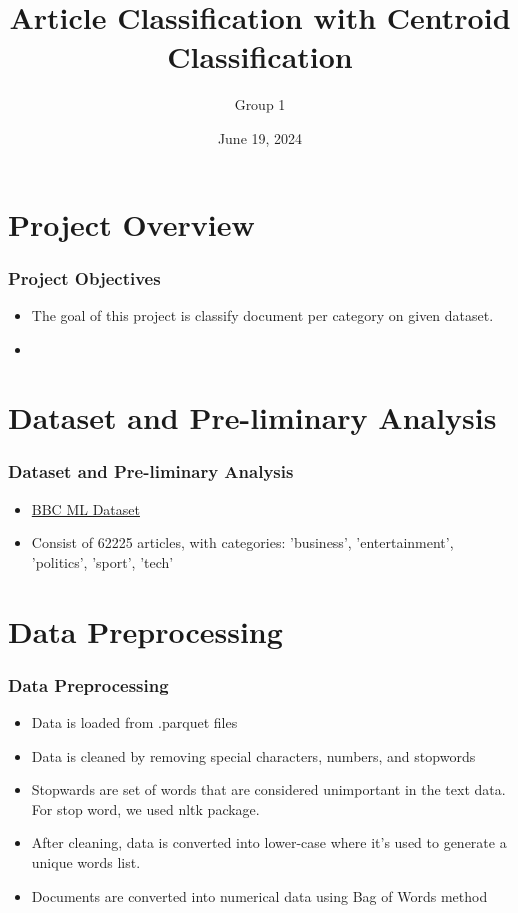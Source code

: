 \documentclass[
    10pt %
    16:9, %
]{beamer}
\title{Article Classification with Centroid Classification}
\subtitle{}
\author{Group 1}
\date[June 19, 2024]
 {June 19, 2024}
\begin{document}
\frame{\titlepage} %
\section[Outline]{}
\frame{\tableofcontents}

\section{Project Overview}
 
\frame %
{
  \frametitle{Project Objectives}
  \begin{itemize}
    \item The goal of this project is classify document per category on given dataset.
    \item 
  \end{itemize}
}
\section{Dataset and Pre-liminary Analysis}
\frame
{
  \frametitle{Dataset and Pre-liminary Analysis}
  \begin{itemize}
    \item \href{http://mlg.ucd.ie/datasets/bbc.html}{BBC ML Dataset}
    \item Consist of 62225 articles, with categories: 'business', 'entertainment', 'politics', 'sport', 'tech'
  \end{itemize}
}

\section{Data Preprocessing}
\frame
{
  \frametitle{Data Preprocessing}
  \begin{itemize}
    \item Data is loaded from .parquet files
    \item Data is cleaned by removing special characters, numbers, and stopwords
    \item Stopwards are set of words that are considered unimportant in the text data. For stop word, we used nltk package.
    \item After cleaning, data is converted into lower-case where it's used to generate a unique words list.
    \item Documents are converted into numerical data using Bag of Words method
  \end{itemize}
}
\end{document}
